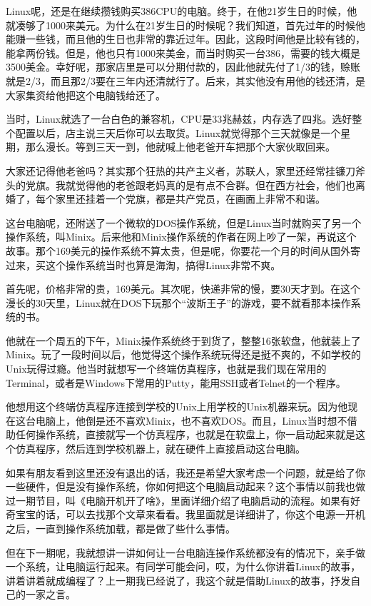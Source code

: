 \documentclass[
  letterpaper,
  DIV=11,
  numbers=noendperiod]{scrreprt}
\begin{document}
Linux呢，还是在继续攒钱购买386CPU的电脑。终于，在他21岁生日的时候，他就凑够了1000来美元。为什么在21岁生日的时候呢？我们知道，首先过年的时候他能赚一些钱，而且他的生日也非常的靠近过年。因此，这段时间他是比较有钱的，能拿两份钱。但是，他也只有1000来美金，而当时购买一台386，需要的钱大概是3500美金。幸好呢，那家店里是可以分期付款的，因此他就先付了1/3的钱，赊账就是2/3，而且那2/3要在三年内还清就行了。后来，其实他没有用他的钱还清，是大家集资给他把这个电脑钱给还了。

当时，Linux就选了一台白色的兼容机，CPU是33兆赫兹，内存选了四兆。选好整个配置以后，店主说三天后你可以去取货。Linux就觉得那个三天就像是一个星期，那么漫长。等到三天一到，他就喊上他老爸开车把那个大家伙取回来。

大家还记得他老爸吗？其实那个狂热的共产主义者，苏联人，家里还经常挂镰刀斧头的党旗。我就觉得他的老爸跟老妈真的是有点不合群。但在西方社会，他们也离婚了，每个家里还挂着一个党旗，都是共产党员，在画面上非常不和谐。

这台电脑呢，还附送了一个微软的DOS操作系统，但是Linux当时就购买了另一个操作系统，叫Minix。后来他和Minix操作系统的作者在网上吵了一架，再说这个故事。那个169美元的操作系统不算太贵，但是呢，你要花一个月的时间从国外寄过来，买这个操作系统当时也算是海淘，搞得Linux非常不爽。

首先呢，价格非常的贵，169美元。其次呢，快递非常的慢，要30天才到。在这个漫长的30天里，Linux就在DOS下玩那个``波斯王子''的游戏，要不就看那本操作系统的书。

他就在一个周五的下午，Minix操作系统终于到货了，整整16张软盘，他就装上了Minix。玩了一段时间以后，他觉得这个操作系统玩得还是挺不爽的，不如学校的Unix玩得过瘾。他当时就想写一个终端仿真程序，也就是我们现在常用的Terminal，或者是Windows下常用的Putty，能用SSH或者Telnet的一个程序。

他想用这个终端仿真程序连接到学校的Unix上用学校的Unix机器来玩。因为他现在这台电脑上，他倒是还不喜欢Minix，也不喜欢DOS。而且，Linux当时想不借助任何操作系统，直接就写一个仿真程序，也就是在软盘上，你一启动起来就是这个仿真程序，然后连到学校机器上，就在硬件上直接启动这台电脑。

如果有朋友看到这里还没有退出的话，我还是希望大家考虑一个问题，就是给了你一些硬件，但是没有操作系统，你如何把这个电脑启动起来？这个事情以前我也做过一期节目，叫《电脑开机开了啥》，里面详细介绍了电脑启动的流程。如果有好奇宝宝的话，可以去找那个文章来看看。我里面就是详细讲了，你这个电源一开机之后，一直到操作系统加载，都是做了些什么事情。

但在下一期呢，我就想讲一讲如何让一台电脑连操作系统都没有的情况下，亲手做一个系统，让电脑运行起来。有同学可能会问，哎，为什么你讲着Linux的故事，讲着讲着就成编程了？上一期我已经说了，我这个就是借助Linux的故事，抒发自己的一家之言。
\end{document}
